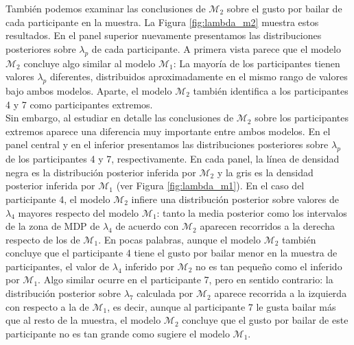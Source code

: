 \documentclass{article}
\begin{document}
\indent También podemos examinar las conclusiones de $\mathcal M_2$ sobre el gusto por bailar de cada participante en la muestra. La Figura \ref{fig:lambda_m2} muestra estos resultados. En el panel superior nuevamente presentamos las distribuciones posteriores sobre $\lambda_p$ de cada participante. A primera vista parece que el modelo $\mathcal M_2$ concluye algo similar al modelo $\mathcal M_1$: La mayoría de los participantes tienen valores $\lambda_p$ diferentes, distribuidos aproximadamente en el mismo rango de valores bajo ambos modelos. Aparte, el modelo $\mathcal M_2$ también identifica a los participantes 4 y 7 como participantes extremos.\\
\indent Sin embargo, al estudiar en detalle las conclusiones de $\mathcal M_2$ sobre los participantes extremos aparece una diferencia muy importante entre ambos modelos. En el panel central y en el inferior presentamos las distribuciones posteriores sobre $\lambda_p$ de los participantes 4 y 7, respectivamente. En cada panel, la línea de densidad negra es la distribución posterior inferida por $\mathcal M_2$ y la gris es la densidad posterior inferida por $\mathcal M_1$ (ver Figura \ref{fig:lambda_m1}). En el caso del participante 4, el modelo $\mathcal M_2$ infiere una distribución posterior sobre valores de $\lambda_4$ mayores respecto del modelo $\mathcal M_1$: tanto la media posterior como los intervalos de la zona de MDP de $\lambda_4$ de acuerdo con $\mathcal M_2$ aparecen recorridos a la derecha respecto de los de $\mathcal M_1$. En pocas palabras, aunque el modelo $\mathcal M_2$ también concluye que  el participante 4 tiene el gusto por bailar menor en la muestra de participantes, el valor de $\lambda_4$ inferido por $\mathcal M_2$ no es tan pequeño como el inferido por $\mathcal M_1$. Algo similar ocurre en el participante 7, pero en sentido contrario: la distribución posterior sobre $\lambda_7$ calculada por $\mathcal M_2$ aparece recorrida a la izquierda con respecto a la de $\mathcal M_1$, es decir, aunque al participante 7 le gusta bailar más que al resto de la muestra, el modelo $\mathcal M_2$ concluye que el gusto por bailar de este participante no es tan grande como sugiere el modelo $\mathcal M_1$.\\
\end{document}
